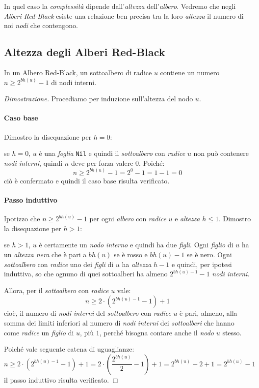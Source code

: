 In quel caso la \emph{complessità} dipende dall'\emph{altezza} dell'\emph{albero}.
Vedremo che negli \emph{Alberi Red-Black} esiste una relazione ben precisa tra
la loro \emph{altezza} il numero di noi \emph{nodi} che contengono.
\newpage
\subsection{Altezza degli Alberi Red-Black}
\begin{definition}
    In un Albero Red-Black, un sottoalbero di radice $u$ contiene un numero
    $n\geq 2^{bh(u)}-1$ di nodi interni.
\end{definition}
\begin{proof}[Dimostrazione]
    Procediamo per induzione sull'altezza del nodo $u$.
    \paragraph{Caso base} Dimostro la disequazione per $h=0$:

    se $h=0$, $u$ è una \emph{foglia} \texttt{Nil} e quindi il \emph{sottoalbero}
    con \emph{radice} $u$ non può contenere \emph{nodi interni}, quindi $n$ deve
    per forza valere $0$. Poiché:
    \[n\geq2^{bh(u)}-1=2^0-1=1-1=0\]
    ciò è confermato e quindi il caso base risulta verificato.

    \paragraph{Passo induttivo} Ipotizzo che $n\geq2^{bh(u)}-1$ per ogni
    \emph{albero} con \emph{radice} $u$ e \emph{altezza} $h\leq1$. Dimostro la
    disequazione per $h>1$:

    se $h>1$, $u$ è certamente un \emph{nodo interno} e quindi ha due \emph{figli}.
    Ogni \emph{figlio} di $u$ ha un \emph{altezza nera} che è pari a $bh(u)$ se
    è rosso e $bh(u)-1$ se è nero. Ogni \emph{sottoalbero} con \emph{radice} uno
    dei \emph{figli} di $u$ ha \emph{altezza} $h-1$ e quindi, per ipotesi induttiva,
    so che ognuno di quei sottoalberi ha almeno $2^{bh(u)-1}-1$ \emph{nodi interni}.

    Allora, per il \emph{sottoalbero} con \emph{radice} $u$ vale:
    \[n\geq2\cdot\left(2^{bh(u)-1}-1\right)+1\]
    cioè, il numero di \emph{nodi interni} del \emph{sottoalbero} con \emph{radice}
    $u$ è pari, almeno, alla somma dei limiti inferiori al numero di \emph{nodi
    interni} dei \emph{sottoalberi} che hanno come \emph{radice} un \emph{figlio}
    di $u$, più $1$, perché bisogna contare anche il \emph{nodo} $u$ stesso.

    Poiché vale seguente catena di uguaglianze:
    \[n\geq2\cdot\left(2^{bh(u)-1}-1\right)+1=2\cdot\left(\frac{2^{bh(u)}}{2}-1
    \right)+1=2^{bh(u)}-2+1=2^{bh(u)}-1\]
    il passo induttivo risulta verificato.
\end{proof}

